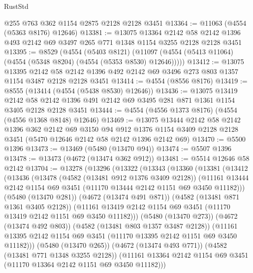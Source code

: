 \begin{lexlean}{RustStd}
\begin{coremodule}
{\begin{coremodule}
{{{{{{{{{{{{{{{{    @255
    @763
    @362
    @1154
    @2875
    @2128
    @2128
    @3451
@13364 := @11063 (@4554 (@5363 @8176) @12646)
@13381 := @13075
    @13364
    @2142
    @58
    @2142
    @1396
    @493
    @2142
    @69
    @3497
    @265
    @771
    @1348
    @1154
    @3255
    @2128
    @2128
    @3451
@13395 := @8529
    (@4554
      (@5403 @8121)
      (@11097 (@4554 (@5413 @11064) (@4554 (@5348 @8204) (@4554 (@5353 @8530) @12646)))))
@13412 := @13075
    @13395
    @2142
    @58
    @2142
    @1396
    @492
    @2142
    @69
    @3496
    @273
    @803
    @1357
    @1154
    @3487
    @2128
    @2128
    @3451
@13414 := @4554 (@8556 @8176)
@13419 := @8555 (@13414 (@4554 (@5438 @8530) @12646))
@13436 := @13075
    @13419
    @2142
    @58
    @2142
    @1396
    @491
    @2142
    @69
    @3495
    @281
    @871
    @1361
    @1154
    @3405
    @2128
    @2128
    @3451
@13444 := @4554 (@4556 @1373 @8176) (@4554 (@4556 @1368 @8148) @12646)
@13469 := @13075
    @13444
    @2142
    @58
    @2142
    @1396
    @362
    @2142
    @69
    @3150
    @94
    @912
    @1376
    @1154
    @3409
    @2128
    @2128
    @3451
    (@5470 @12646 @2142 @58 @2142 @1396 @2142 @69)
@13470 := @5500 @1396
@13473 := @13469 (@5480 (@13470 @94))
@13474 := @5507 @1396
@13478 := @13473 (@4672 (@13474 @362 @912))
@13481 := @5514 @12646 @58 @2142
@13704 := @13278
    (@13296
      (@13322
        (@13343
          (@13360
            (@13381
              (@13412
                (@13436
                  (@13478
                    (@4582 (@13481 @912 @1376 @3409 @2128))
                    (@11161
                      @13444
                      @2142
                      @1154
                      @69
                      @3451
                      (@11170 @13444 @2142 @1151 @69 @3450 @11182)))
                  (@5480 (@13470 @281))
                  (@4672 (@13474 @491 @871))
                  (@4582 (@13481 @871 @1361 @3405 @2128))
                  (@11161
                    @13419
                    @2142
                    @1154
                    @69
                    @3451
                    (@11170 @13419 @2142 @1151 @69 @3450 @11182)))
                (@5480 (@13470 @273))
                (@4672 (@13474 @492 @803))
                (@4582 (@13481 @803 @1357 @3487 @2128))
                (@11161 @13395 @2142 @1154 @69 @3451 (@11170 @13395 @2142 @1151 @69 @3450 @11182)))
              (@5480 (@13470 @265))
              (@4672 (@13474 @493 @771))
              (@4582 (@13481 @771 @1348 @3255 @2128))
              (@11161 @13364 @2142 @1154 @69 @3451 (@11170 @13364 @2142 @1151 @69 @3450 @11182)))
}}}}}}}}}}}}}}}}
\end{coremodule}}
\end{coremodule}
\end{lexlean}
